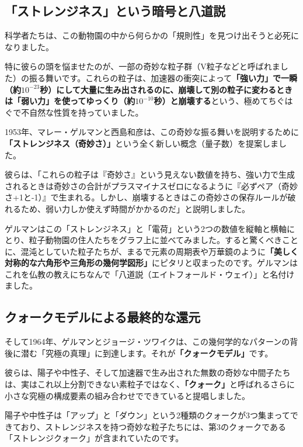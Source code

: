\subsection{「ストレンジネス」という暗号と八道説}

科学者たちは、この動物園の中から何らかの「規則性」を見つけ出そうと必死になりました。

特に彼らの頭を悩ませたのが、一部の奇妙な粒子群（V粒子などと呼ばれました）の振る舞いです。これらの粒子は、加速器の衝突によって\textbf{「強い力」で一瞬（約\(10^{-23}\)秒）にして大量に生み出されるのに、崩壊して別の粒子に変わるときは「弱い力」を使ってゆっくり（約\(10^{-10}\)秒）と崩壊する}という、極めてちぐはぐで不自然な性質を持っていました。

1953年、マレー・ゲルマンと西島和彦は、この奇妙な振る舞いを説明するために\textbf{「ストレンジネス（奇妙さ）」}という全く新しい概念（量子数）を提案しました。

彼らは、「これらの粒子は『奇妙さ』という見えない数値を持ち、強い力で生成されるときは奇妙さの合計がプラスマイナスゼロになるように『必ずペア（奇妙さ+1と-1）』で生まれる。しかし、崩壊するときはこの奇妙さの保存ルールが破れるため、弱い力しか使えず時間がかかるのだ」と説明しました。

ゲルマンはこの「ストレンジネス」と「電荷」という2つの数値を縦軸と横軸にとり、粒子動物園の住人たちをグラフ上に並べてみました。すると驚くべきことに、混沌としていた粒子たちが、まるで元素の周期表や万華鏡のように\textbf{「美しく対称的な六角形や三角形の幾何学図形」}にピタリと収まったのです。ゲルマンはこれを仏教の教えにちなんで「八道説（エイトフォールド・ウェイ）」と名付けました。

\subsection{クォークモデルによる最終的な還元}

そして1964年、ゲルマンとジョージ・ツワイクは、この幾何学的なパターンの背後に潜む「究極の真理」に到達します。それが\textbf{「クォークモデル」}です。

彼らは、陽子や中性子、そして加速器で生み出された無数の奇妙な中間子たちは、実はこれ以上分割できない素粒子ではなく、\textbf{「クォーク」}と呼ばれるさらに小さな究極の構成要素の組み合わせでできていると提唱しました。

陽子や中性子は「アップ」と「ダウン」という2種類のクォークが3つ集まってできており、ストレンジネスを持つ奇妙な粒子たちには、第3のクォークである「ストレンジクォーク」が含まれていたのです。

